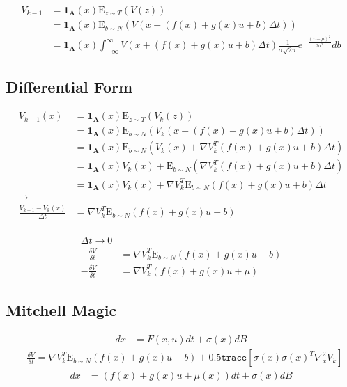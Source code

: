 \documentclass[a4paper]{article}
\begin{document}
\begin{align*}
V_{k-1} & = \mathbf{1_A}(x) \mathrm{E}_{z \sim T} (V(z))
\\ & = \mathbf{1_A}(x) \mathrm{E}_{b\sim N} (V( x + (f(x) + g(x) u + b) \Delta t) )
\\ & = \mathbf{1_A}(x) \int_{-\infty}^{\infty} V( x + (f(x) + g(x) u + b) \Delta t) \frac{1}{\sigma \sqrt{2 \pi}} e^{-\frac{(x-\mu)^2}{2 \sigma^2}} db
\end{align*}

\subsection{Differential Form}

\begin{align*}
V_{k-1}(x) & = \mathbf{1_A}(x) \mathrm{E}_{z \sim T} (V_k(z))
\\ & = \mathbf{1_A}(x) \mathrm{E}_{b\sim N} (V_k( x + (f(x) + g(x) u + b) \Delta t) )
\\ & = \mathbf{1_A}(x) \mathrm{E}_{b\sim N} (V_k( x ) + \nabla V_k^T (f(x) + g(x) u + b) \Delta t )
\\ & = \mathbf{1_A}(x) V_k(x) + \mathrm{E}_{b\sim N} ( \nabla V_k^T (f(x) + g(x) u + b) \Delta t )
\\ & = \mathbf{1_A}(x) V_k(x) + \nabla V_k^T \mathrm{E}_{b\sim N} ( f(x) + g(x) u + b ) \Delta t
\\ \rightarrow
\\ \frac{V_{k-1} - V_k(x)}{\Delta t} &= \nabla V_k^T \mathrm{E}_{b\sim N} ( f(x) + g(x) u + b )
\end{align*}

\begin{align*}
\\ \Delta t \rightarrow 0
\\ -\frac{\delta V}{\delta t} &= \nabla V_k^T \mathrm{E}_{b\sim N} ( f(x) + g(x) u + b )
\\ -\frac{\delta V}{\delta t} &= \nabla V_k^T ( f(x) + g(x) u + \mu )
\end{align*}

\subsection{Mitchell Magic}

\begin{align*}
dx &= F(x,u) dt + \sigma(x) dB
\end{align*}
\begin{align*}
-\frac{\delta V}{\delta t} = \nabla V_k^T \mathrm{E}_{b\sim N} ( f(x) + g(x) u + b ) + 0.5 \texttt{trace} [\sigma(x) \sigma(x)^T \nabla^2_x V_k]
\end{align*}
\begin{align*}
dx &= (f(x) + g(x) u + \mu(x) ) dt + \sigma(x) dB
\end{align*}
\end{document}
